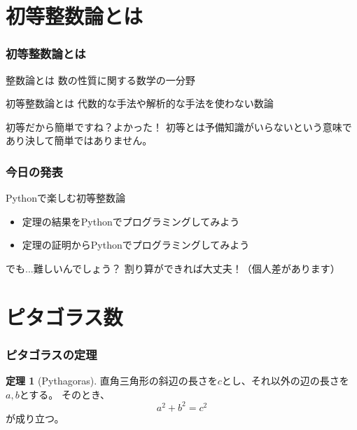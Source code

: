 \documentclass[dvipdfmx,11pt,notheorems]{beamer}
\theoremstyle{definition}
\newtheorem{theorem}{定理}
\begin{document}
\section{初等整数論とは}

\begin{frame}\frametitle{初等整数論とは}

\begin{block}{整数論とは}
数の性質に関する数学の一分野
\end{block}

\begin{block}{初等整数論とは}
代数的な手法や解析的な手法を使わない数論
\end{block}

\begin{alertblock}{初等だから簡単ですね？よかった！}
初等とは予備知識がいらないという意味であり決して簡単ではありません。
\end{alertblock}

\end{frame}

\begin{frame}\frametitle{今日の発表}

\begin{block}{Pythonで楽しむ初等整数論}
\begin{itemize}
\item 定理の結果をPythonでプログラミングしてみよう
\item 定理の証明からPythonでプログラミングしてみよう
\end{itemize}
\end{block}

\begin{exampleblock}{でも...難しいんでしょう？}
割り算ができれば大丈夫！（個人差があります）
\end{exampleblock}

\end{frame}

\section{ピタゴラス数}

\begin{frame}\frametitle{ピタゴラスの定理}

\begin{theorem}[Pythagoras]
直角三角形の斜辺の長さを$c$とし、それ以外の辺の長さを$a, b$とする。
そのとき、
\begin{equation*}
a^{2} + b^{2} = c^{2}
\end{equation*}
 が成り立つ。
\end{theorem}

\end{frame}
\end{document}
